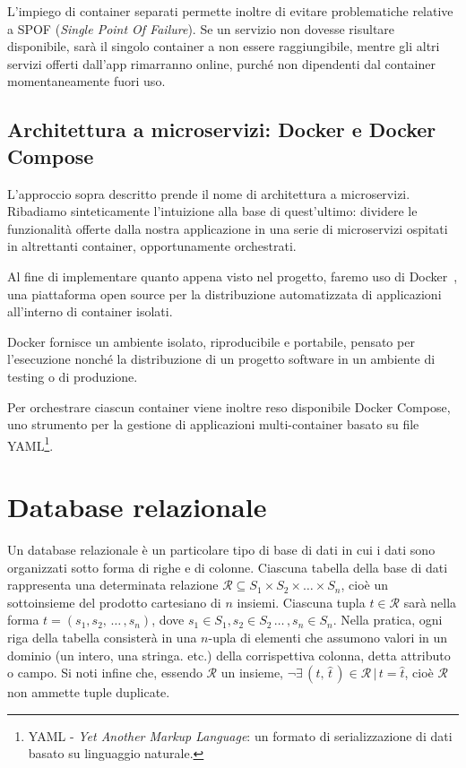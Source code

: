 L'impiego di container separati permette inoltre di evitare problematiche relative a SPOF (\textit{Single Point Of Failure}). Se un servizio non dovesse risultare disponibile, sarà il singolo container a non essere raggiungibile, mentre gli altri servizi offerti dall'app rimarranno online, purché non dipendenti dal container momentaneamente fuori uso.   
\subsection{Architettura a microservizi: Docker e Docker Compose}
L'approccio sopra descritto prende il nome di architettura a microservizi. Ribadiamo sinteticamente l'intuizione alla base di quest'ultimo: dividere le funzionalità offerte dalla nostra applicazione in una serie di microservizi ospitati in altrettanti container, opportunamente orchestrati.

Al fine di implementare quanto appena visto nel progetto, faremo uso di Docker~\cite{docker_docs}, una piattaforma open source per la distribuzione automatizzata di applicazioni all'interno di container isolati.

Docker fornisce un ambiente isolato, riproducibile e portabile, pensato per l'esecuzione nonché la distribuzione di un progetto software in un ambiente di testing o di produzione.

Per orchestrare ciascun container viene inoltre reso disponibile Docker Compose, uno strumento per la gestione di applicazioni multi-container basato su file YAML\footnote{YAML - \textit{Yet Another Markup Language}: un formato di serializzazione di dati basato su linguaggio naturale.}.        
\section{Database relazionale}
Un database relazionale è un particolare tipo di base di dati in cui i dati sono organizzati sotto forma di righe e di colonne. Ciascuna tabella della base di dati rappresenta una determinata relazione $\mathscr{R} \subseteq S_1 \times S_2 \times \dots \times S_n$, cioè un sottoinsieme del prodotto cartesiano di $n$ insiemi. Ciascuna tupla $t \in \mathscr{R}$ sarà nella forma $t = (s_1, s_2, \, \dots \,, s_n)$, dove $s_1 \in S_1, s_2 \in S_2 \, \dots \, , s_n \in S_n$. Nella pratica, ogni riga della tabella consisterà in una $n$-upla di elementi che assumono valori in un dominio (un intero, una stringa. etc.) della corrispettiva colonna, detta attributo o campo. Si noti infine che, essendo $\mathscr{R}$ un insieme, $\neg \exists \,(t,\, \hat{t}\,) \in \mathscr{R} \, | \, t = \hat{t}$, cioè $\mathscr{R}$ non ammette tuple duplicate.
